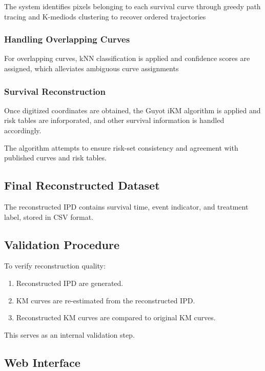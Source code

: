 \documentclass[11pt]{article}
\begin{document}
The system identifies pixels belonging to each survival curve through greedy path tracing and K-mediods clustering to recover ordered trajectories

\subsubsection*{Handling Overlapping Curves}

For overlapping curves, kNN classification is applied and confidence scores are assigned, which alleviates ambiguous curve assignments

\subsubsection*{Survival Reconstruction}

Once digitized coordinates are obtained, the Guyot iKM algorithm is applied and risk tables are inforporated, and other survival information is handled accordingly.

The algorithm attempts to ensure risk-set consistency and agreement with published curves and risk tables.

\subsection*{Final Reconstructed Dataset}

The reconstructed IPD contains survival time, event indicator, and treatment label, stored in CSV format.

\subsection*{Validation Procedure}

To verify reconstruction quality:

\begin{enumerate}
    \item Reconstructed IPD are generated.
    \item KM curves are re-estimated from the reconstructed IPD.
    \item Reconstructed KM curves are compared to original KM curves.
\end{enumerate}

This serves as an internal validation step.

\subsection*{Web Interface}
\end{document}
